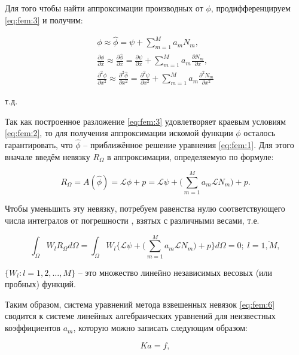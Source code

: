 \documentclass[14pt]{extreport}
\begin{document}
Для того чтобы найти аппроксимации производных от $\phi$, продифференцируем \eqref{eq:fem:3} и получим:


\begin{gather}
\phi \approx \hat\phi = \psi + \sum\limits_{m=1}^{M} a_mN_m,\nonumber\\
\frac{\partial \phi}{\partial x} \approx \frac{\partial \hat\phi}{\partial x}=\frac{\partial \psi}{\partial x}+\sum\limits_{m=1}^{M} a_m\frac{\partial N_m}{\partial x},\nonumber\\
\frac{\partial^2 \phi}{\partial x^2} \approx \frac{\partial^2 \hat\phi}{\partial x^2}=\frac{\partial^2 \psi}{\partial x^2}+\sum\limits_{m=1}^{M} a_m\frac{\partial^2 N_m}{\partial x^2} \nonumber
\end{gather}

 т.д.

Так как построенное разложение \eqref{eq:fem:3} удовлетворяет краевым условиям \eqref{eq:fem:2}, то для получения аппроксимации искомой функции $\phi$ осталось гарантировать, что $\hat\phi$ -- приближённое решение уравнения \eqref{eq:fem:1}. Для этого вначале введём невязку $R_\Omega$ в аппроксимации, определяемую по формуле:

\begin{equation}\label{eq:fem:5}
R_\Omega=A(\hat\phi)=\mathcal L \hat\phi+p=\mathcal L\psi+\bigg(\sum\limits_{m=1}^{M} a_m \mathcal L N_m\bigg) +p.
\end{equation}

Чтобы уменьшить эту невязку, потребуем равенства нулю соответствующего числа интегралов от погрешности \cite{bib:calc:zorich}, взятых с различными весами, т.е.

\begin{equation}\label{eq:fem:6}
\int_\Omega W_l R_\Omega d\Omega = \int_\Omega W_l \bigg\{\mathcal L \psi +\bigg(\sum\limits_{m=1}^{M} a_m \mathcal L N_m\bigg) +p \bigg\} d\Omega =0; \; l=\overline{1,M},
\end{equation}

 $\{W_l:l=1,2,\dots,M\}$ -- это множество линейно независимых весовых (или пробных) функций.

Таким образом, система уравнений метода взвешенных невязок \eqref{eq:fem:6} сводится к системе линейных алгебраических уравнений для неизвестных коэффициентов $a_m$, которую можно записать следующим образом:

\begin{equation}\label{eq:fem:7}
Ka=f,
\end{equation}
\end{document}
